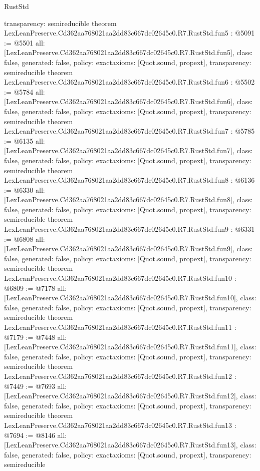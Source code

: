 \begin{lexlean}{RustStd}
\begin{coremodule}
{  transparency: semireducible
}
theorem LexLeanPreserve.Cd362aa768021aa2dd83c667dc02645c0.R7.RustStd.fun5 : @5091 := @5501 {
  all: [LexLeanPreserve.Cd362aa768021aa2dd83c667dc02645c0.R7.RustStd.fun5],
  class: false,
  generated: false,
  policy: exact{axioms: [Quot.sound, propext]},
  transparency: semireducible
}
theorem LexLeanPreserve.Cd362aa768021aa2dd83c667dc02645c0.R7.RustStd.fun6 : @5502 := @5784 {
  all: [LexLeanPreserve.Cd362aa768021aa2dd83c667dc02645c0.R7.RustStd.fun6],
  class: false,
  generated: false,
  policy: exact{axioms: [Quot.sound, propext]},
  transparency: semireducible
}
theorem LexLeanPreserve.Cd362aa768021aa2dd83c667dc02645c0.R7.RustStd.fun7 : @5785 := @6135 {
  all: [LexLeanPreserve.Cd362aa768021aa2dd83c667dc02645c0.R7.RustStd.fun7],
  class: false,
  generated: false,
  policy: exact{axioms: [Quot.sound, propext]},
  transparency: semireducible
}
theorem LexLeanPreserve.Cd362aa768021aa2dd83c667dc02645c0.R7.RustStd.fun8 : @6136 := @6330 {
  all: [LexLeanPreserve.Cd362aa768021aa2dd83c667dc02645c0.R7.RustStd.fun8],
  class: false,
  generated: false,
  policy: exact{axioms: [Quot.sound, propext]},
  transparency: semireducible
}
theorem LexLeanPreserve.Cd362aa768021aa2dd83c667dc02645c0.R7.RustStd.fun9 : @6331 := @6808 {
  all: [LexLeanPreserve.Cd362aa768021aa2dd83c667dc02645c0.R7.RustStd.fun9],
  class: false,
  generated: false,
  policy: exact{axioms: [Quot.sound, propext]},
  transparency: semireducible
}
theorem LexLeanPreserve.Cd362aa768021aa2dd83c667dc02645c0.R7.RustStd.fun10 : @6809 := @7178 {
  all: [LexLeanPreserve.Cd362aa768021aa2dd83c667dc02645c0.R7.RustStd.fun10],
  class: false,
  generated: false,
  policy: exact{axioms: [Quot.sound, propext]},
  transparency: semireducible
}
theorem LexLeanPreserve.Cd362aa768021aa2dd83c667dc02645c0.R7.RustStd.fun11 : @7179 := @7448 {
  all: [LexLeanPreserve.Cd362aa768021aa2dd83c667dc02645c0.R7.RustStd.fun11],
  class: false,
  generated: false,
  policy: exact{axioms: [Quot.sound, propext]},
  transparency: semireducible
}
theorem LexLeanPreserve.Cd362aa768021aa2dd83c667dc02645c0.R7.RustStd.fun12 : @7449 := @7693 {
  all: [LexLeanPreserve.Cd362aa768021aa2dd83c667dc02645c0.R7.RustStd.fun12],
  class: false,
  generated: false,
  policy: exact{axioms: [Quot.sound, propext]},
  transparency: semireducible
}
theorem LexLeanPreserve.Cd362aa768021aa2dd83c667dc02645c0.R7.RustStd.fun13 : @7694 := @8146 {
  all: [LexLeanPreserve.Cd362aa768021aa2dd83c667dc02645c0.R7.RustStd.fun13],
  class: false,
  generated: false,
  policy: exact{axioms: [Quot.sound, propext]},
  transparency: semireducible
}
\end{coremodule}
\end{lexlean}
